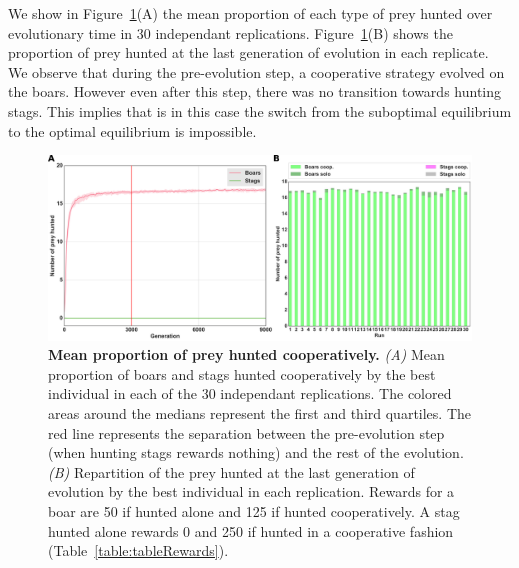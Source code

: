     We show in Figure~\ref{fig:figControl}(A) the mean proportion of each type of prey hunted over evolutionary time in $30$ independant replications. Figure~\ref{fig:figControl}(B) shows the proportion of prey hunted at the last generation of evolution in each replicate. We observe that during the pre-evolution step, a cooperative strategy evolved on the boars. However even after this step, there was no transition towards hunting stags. This implies that is in this case the switch from the suboptimal equilibrium to the optimal equilibrium is impossible. 


    \begin{figure}[h]
      \centerfloat
        \includegraphics[width=1.2\linewidth]{fig/ArticleBio2/Fig1.png}
        \caption{\textbf{Mean proportion of prey hunted cooperatively.}
        \emph{(A)} Mean proportion of boars and stags hunted cooperatively by the best individual in each of the $30$ independant replications. The colored areas around the medians represent the first and third quartiles. The red line represents the separation between the pre-evolution step (when hunting stags rewards nothing) and the rest of the evolution. \emph{(B)} Repartition of the prey hunted at the last generation of evolution by the best individual in each replication. Rewards for a boar are 50 if hunted alone and 125 if hunted cooperatively. A stag hunted alone rewards 0 and 250 if hunted in a cooperative fashion (Table~\ref{table:tableRewards}).}
      \label{fig:figControl}
    \end{figure}

